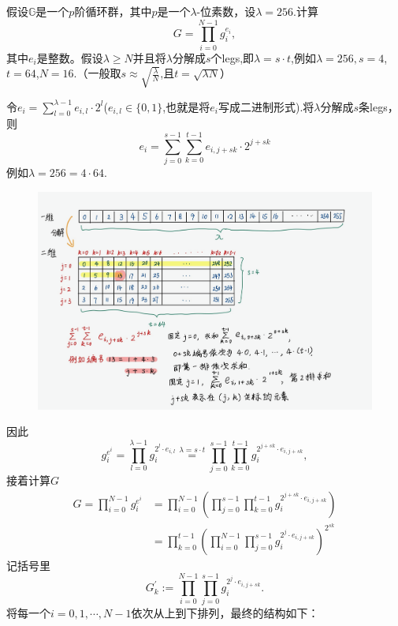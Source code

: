 \documentclass[10pt]{ctexart}
\begin{document}
假设$\mathbb{G}$是一个$p$阶循环群，其中$p$是一个$\lambda$-位素数，设$\lambda = 256$.计算
$$
G = \prod_{i = 0}^{N-1}g_i^{e_i},
$$
其中$e_i$是整数。假设$\lambda \ge N$并且将$\lambda$分解成$s$个legs,即$\lambda = s \cdot t$,例如$\lambda = 256, s=4$,$t=64$,$N=16$.（一般取$s \approx \sqrt{\frac{\lambda}{N}}$,且$t = \sqrt{\lambda N}$）

令$e_i = \sum_{l=0}^{\lambda - 1}e_{i,l} \cdot 2^l$($e_{i,l} \in \{0,1\}$,也就是将$e_i$写成二进制形式).将$\lambda$分解成$s$条legs，则
$$
e_i = \sum_{j=0}^{s-1} \sum_{k=0}^{t-1}e_{i,j+sk} \cdot 2^{j+sk}
$$
例如$\lambda = 256 = 4 \cdot 64$.
\begin{figure}[H]
    \centering
    \includegraphics[width=1\textwidth]{./img/sum.png} 
\end{figure}
因此
$$
g_i^{e^i} = \prod_{l=0}^{\lambda -1}g_i^{2^l \cdot e_{i,l} } \overset{\lambda = s \cdot t}{=} \prod_{j=0}^{s-1} \prod_{k=0}^{t-1} g_i^{2^{j+sk} \cdot e_{i,j+sk}},
$$
接着计算$G$
\begin{displaymath}
    \begin{aligned}
        G= \prod_{i = 0}^{N-1}g_i^{e^i} & = \prod_{i = 0}^{N-1} \left( \prod_{j=0}^{s-1} \prod_{k=0}^{t-1} g_i^{2^{j+sk} \cdot e_{i,j+sk}} \right)\\
        & = \prod_{k = 0}^{t-1} \left( \prod_{i=0}^{N-1} \prod_{j=0}^{s-1}  g_i^{2^{j} \cdot e_{i,j+sk}} \right)^{2^{sk}}
    \end{aligned}
\end{displaymath}
记括号里
$$
G_k^{\prime} := \prod_{i=0}^{N-1} \prod_{j=0}^{s-1}  g_i^{2^{j} \cdot e_{i,j+sk}}.
$$
将每一个$i=0,1,\cdots,N-1$依次从上到下排列，最终的结构如下：
\end{document}
